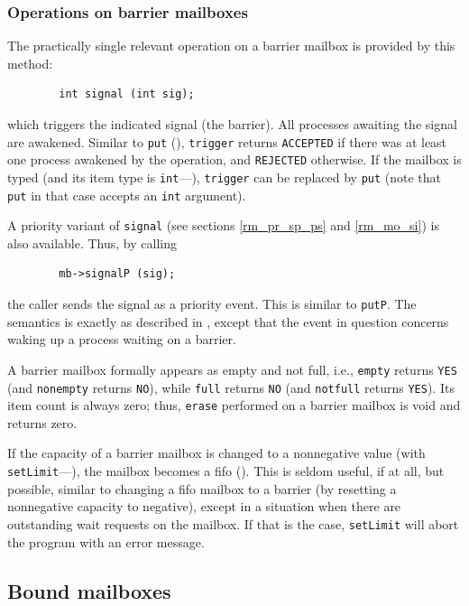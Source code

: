 \subsubsection{Operations on barrier mailboxes}
\label{rm_mb_ba_op}

The practically single relevant operation on a barrier mailbox is provided by
this method:
\begin{verbatim}
        int signal (int sig);
\end{verbatim}
which triggers the indicated signal (the barrier).
All processes awaiting the signal are awakened.
Similar to {\tt put} (), {\tt trigger} returns
{\tt ACCEPTED} if there was at least one process awakened by the operation,
and {\tt REJECTED} otherwise.
If the mailbox is typed (and its item type is {\tt int}---),
{\tt trigger} can be
replaced by {\tt put} (note that {\tt put} in that case
accepts an {\tt int} argument).

A priority variant of {\tt signal} (see sections \ref{rm_pr_sp_ps} and
\ref{rm_mo_si}) is also available.
Thus, by calling
\begin{verbatim}
        mb->signalP (sig);
\end{verbatim}
the caller sends the signal as a priority event.
This is similar to {\tt putP}.
The semantics is exactly as described in , except that the
event in question concerns waking up a process waiting on a barrier.

A barrier mailbox formally appears as empty and not full, i.e.,
{\tt empty} returns {\tt YES} (and {\tt nonempty} returns {\tt NO}),
while {\tt full} returns {\tt NO} (and {\tt notfull} returns {\tt YES}).
Its item count is always zero;
thus, {\tt erase} performed on a barrier mailbox is void and returns zero.

If the capacity of a barrier mailbox is changed to a nonnegative value
(with {\tt setLimit}---), the mailbox becomes a fifo
().
This is seldom useful, if at all, but
possible, similar to changing a fifo mailbox to a barrier
(by resetting a nonnegative capacity to negative), except
in a situation when there are outstanding wait requests on the mailbox.
If that is the case, {\tt setLimit} will abort the program with an error
message.

\subsection{Bound mailboxes}
\label{rm_mb_bo}

